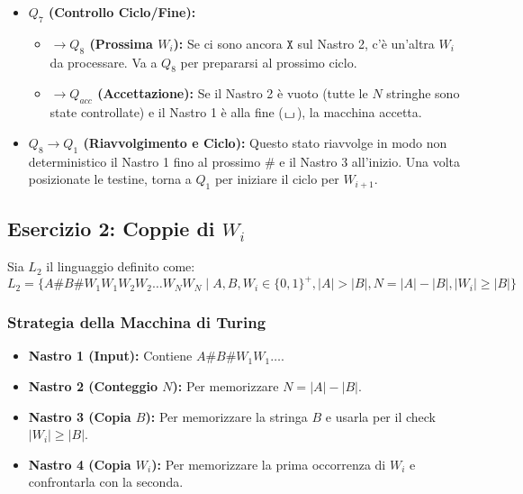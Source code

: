 \documentclass[a4paper]{article}
\theoremstyle{definition} %
\newcommand{\blankS}{\ensuremath{\raisebox{-0.15ex}{\scalebox{1.3}[0.7]{$\sqcup$}}\mkern2mu}}
\newcommand{\B}{\blankS} %
\newcommand{\Sh}{\texttt{\#}} %
\newcommand{\X}{\texttt{X}} %
\begin{document}
\begin{itemize}
    \item \textbf{$Q_7$ (Controllo Ciclo/Fine):}
        \begin{itemize}
            \item \textbf{$\to Q_8$ (Prossima $W_i$):} Se ci sono ancora $\X$ sul Nastro 2, c'è un'altra $W_i$ da processare. Va a $Q_8$ per prepararsi al prossimo ciclo.
            \item \textbf{$\to Q_{acc}$ (Accettazione):} Se il Nastro 2 è vuoto (tutte le $N$ stringhe sono state controllate) e il Nastro 1 è alla fine ($\B$), la macchina accetta.
        \end{itemize}
    \item \textbf{$Q_8 \to Q_1$ (Riavvolgimento e Ciclo):} Questo stato riavvolge in modo non deterministico il Nastro 1 fino al prossimo $\Sh$ e il Nastro 3 all'inizio. Una volta posizionate le testine, torna a $Q_1$ per iniziare il ciclo per $W_{i+1}$.
\end{itemize}


\subsection{Esercizio 2: Coppie di $W_i$}

Sia $L_2$ il linguaggio definito come:
\[
L_2 = \{ A\Sh B\Sh W_1 W_1 W_2 W_2 \dots W_N W_N \mid A, B, W_i \in \{0,1\}^+, |A| > |B|, N = |A| - |B|, |W_i| \ge |B| \}
\]

\subsubsection{Strategia della Macchina di Turing}
\begin{itemize}
    \item \textbf{Nastro 1 (Input):} Contiene $A\Sh B\Sh W_1 W_1 \dots$.
    \item \textbf{Nastro 2 (Conteggio $N$):} Per memorizzare $N = |A| - |B|$.
    \item \textbf{Nastro 3 (Copia $B$):} Per memorizzare la stringa $B$ e usarla per il check $|W_i| \ge |B|$.
    \item \textbf{Nastro 4 (Copia $W_i$):} Per memorizzare la prima occorrenza di $W_i$ e confrontarla con la seconda.
\end{itemize}
\end{document}

